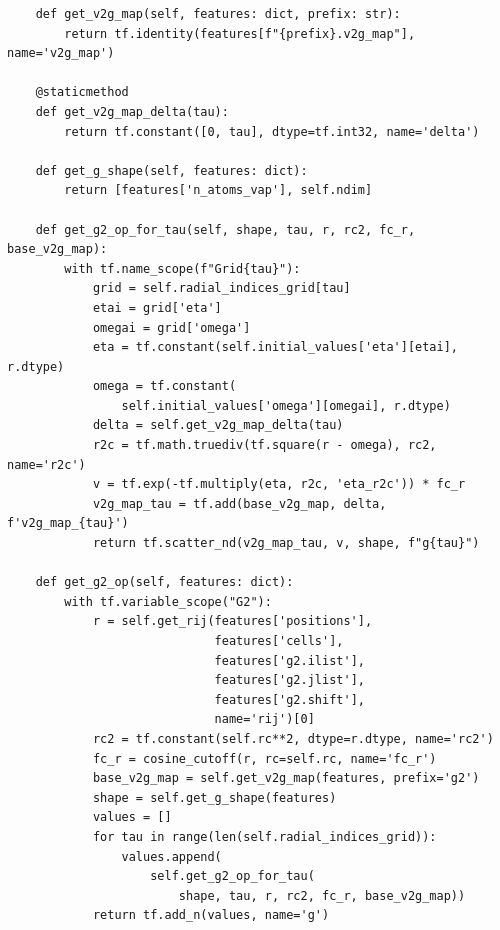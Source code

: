 \documentclass[preprint]{revtex4-2}
\begin{document}
\begin{verbatim}
    def get_v2g_map(self, features: dict, prefix: str):
        return tf.identity(features[f"{prefix}.v2g_map"], name='v2g_map')

    @staticmethod
    def get_v2g_map_delta(tau):
        return tf.constant([0, tau], dtype=tf.int32, name='delta')

    def get_g_shape(self, features: dict):
        return [features['n_atoms_vap'], self.ndim]

    def get_g2_op_for_tau(self, shape, tau, r, rc2, fc_r, base_v2g_map):
        with tf.name_scope(f"Grid{tau}"):
            grid = self.radial_indices_grid[tau]
            etai = grid['eta']
            omegai = grid['omega']
            eta = tf.constant(self.initial_values['eta'][etai], r.dtype)
            omega = tf.constant(
                self.initial_values['omega'][omegai], r.dtype)
            delta = self.get_v2g_map_delta(tau)
            r2c = tf.math.truediv(tf.square(r - omega), rc2, name='r2c')
            v = tf.exp(-tf.multiply(eta, r2c, 'eta_r2c')) * fc_r
            v2g_map_tau = tf.add(base_v2g_map, delta, f'v2g_map_{tau}')
            return tf.scatter_nd(v2g_map_tau, v, shape, f"g{tau}")

    def get_g2_op(self, features: dict):
        with tf.variable_scope("G2"):
            r = self.get_rij(features['positions'],
                             features['cells'],
                             features['g2.ilist'],
                             features['g2.jlist'],
                             features['g2.shift'],
                             name='rij')[0]
            rc2 = tf.constant(self.rc**2, dtype=r.dtype, name='rc2')
            fc_r = cosine_cutoff(r, rc=self.rc, name='fc_r')
            base_v2g_map = self.get_v2g_map(features, prefix='g2')
            shape = self.get_g_shape(features)
            values = []
            for tau in range(len(self.radial_indices_grid)):
                values.append(
                    self.get_g2_op_for_tau(
                        shape, tau, r, rc2, fc_r, base_v2g_map))
            return tf.add_n(values, name='g')


\end{verbatim}
\end{document}
